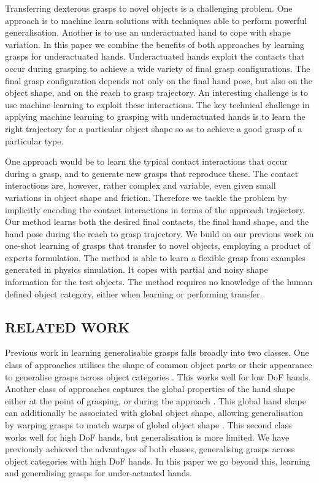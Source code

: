 Transferring dexterous grasps to novel objects is a challenging problem. One approach is to machine learn solutions with techniques able to perform powerful generalisation. Another is to use an underactuated hand to cope with shape variation. In this paper we combine the benefits of both approaches by learning grasps for underactuated hands. Underactuated hands exploit the contacts that occur during grasping to achieve a wide variety of final grasp configurations. The final grasp configuration depends not only on the final hand pose, but also on the object shape, and on the reach to grasp trajectory. An interesting challenge is to use machine learning to exploit these interactions. The key technical challenge in applying machine learning to grasping with underactuated hands is to learn the right trajectory for a particular object shape so as to achieve a good grasp of a particular type. 

One approach would be to learn the typical contact interactions that occur during a grasp, and to generate new grasps that reproduce these. The contact interactions are, however, rather complex and variable, even given small variations in object shape and friction. Therefore we tackle the problem by implicitly encoding the contact interactions in terms of the approach trajectory. Our method learns both the desired final contacts, the final hand shape, and the hand pose during the reach to grasp trajectory. We build on our previous work on one-shot learning of grasps that transfer to novel objects, employing a product of experts formulation. The method is able to learn a flexible grasp from examples generated in physics simulation. It copes with partial and noisy shape information for the test objects. The method requires no knowledge of the human defined object category, either when learning or performing transfer.

\subsection{RELATED WORK}
Previous work in learning generalisable grasps falls broadly into two classes. One class of approaches utilises the shape of common object parts or their appearance to generalise grasps across object categories \cite{saxena2008b,detry2013a,herzog2014a, kroemer2012a}. This works well for low DoF hands. Another class of approaches captures the global properties of the hand shape either at the point of grasping, or during the approach \cite{ben2012generalization}. This global hand shape can additionally be associated with global object shape, allowing generalisation by warping grasps to match warps of global object shape \cite{hillenbrand2012transferring}. This second class works well for high DoF hands, but generalisation is more limited. We have previously achieved the advantages of both classes, generalising grasps across object categories with high DoF hands. In this paper we go beyond this, learning and generalising grasps for under-actuated hands.